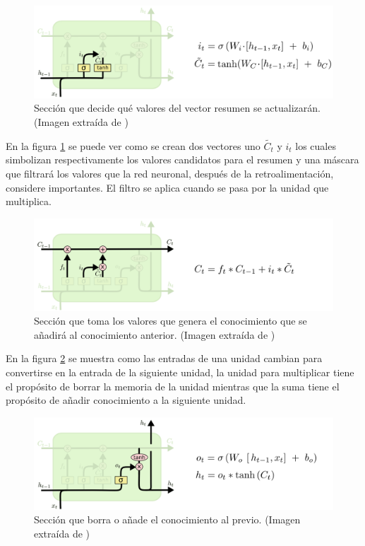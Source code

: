 \begin{figure}[H]
	\centering
	\includegraphics[width=\textwidth]{imagenes/LSTM3-focus-i.png}
	\caption[]{Sección que decide qué valores del vector resumen se actualizarán. (Imagen extraída de \textcite{christopher_olah_2015})}
	\label{fig:lstmAnadir}
\end{figure}


\par En la figura \ref{fig:lstmAnadir} se puede ver como se crean dos vectores uno $\widetilde{C_t}$ y $i_t$ los cuales simbolizan respectivamente los valores candidatos para el resumen y una máscara que filtrará los valores que la red neuronal, después de la retroalimentación, considere importantes. El filtro se aplica cuando se pasa por la unidad que multiplica.

\begin{figure}[H]
	\centering
	\includegraphics[width=\textwidth]{imagenes/LSTM3-focus-C.png}
	\caption[]{Sección que toma los valores que genera el conocimiento que se añadirá al conocimiento anterior. (Imagen extraída de \textcite{christopher_olah_2015})}
	\label{fig:lstmSuma}
\end{figure}

\par En la figura \ref{fig:lstmSuma} se muestra como las entradas de una unidad cambian para convertirse en la entrada de la siguiente unidad, la unidad para multiplicar tiene el propósito de borrar la memoria de la unidad mientras que la suma tiene el propósito de añadir conocimiento a la siguiente unidad.

\begin{figure}[H]
	\centering
	\includegraphics[width=\textwidth]{imagenes/LSTM3-focus-o.png}
	\caption[]{Sección que borra o añade el conocimiento al previo. (Imagen extraída de \textcite{christopher_olah_2015})}
	\label{fig:lstmFinal}
\end{figure}


